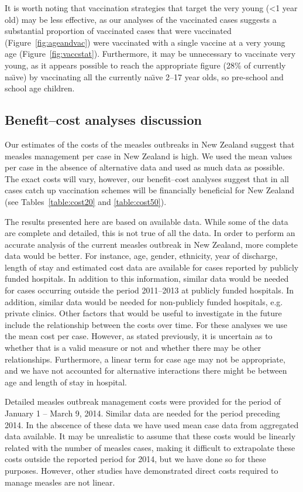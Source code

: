\documentclass{article}
\begin{document}
\begin{itemize}
It is worth noting that vaccination strategies that target the very young (<1 year old) may be less effective, as our analyses of the vaccinated cases suggests a substantial proportion of vaccinated cases that were vaccinated (Figure~\ref{fig:ageandvac}) were vaccinated with a single vaccine at a very young age (Figure~\ref{fig:vaccstat}). Furthermore, it may be unnecessary to vaccinate very young, as it appears possible to reach the appropriate figure (28\% of currently na\"{\i}ve) by vaccinating all the currently na\"{\i}ve 2--17 year olds, so pre-school and school age children.

\subsection{Benefit--cost analyses discussion}

Our estimates of the costs of the measles outbreaks in New Zealand suggest that measles management per case in New Zealand is high. We used the mean values per case in the absence of alternative data and used as much data as possible. The exact costs will vary, however, our benefit--cost analyses suggest that in all cases catch up vaccination schemes will be financially beneficial for New Zealand (see Tables~\ref{table:cost20} and \ref{table:cost50}).

The results presented here are based on available data. While some of the data are complete and detailed, this is not true of all the data. In order to perform an accurate analysis of the current measles outbreak in New Zealand, more complete data would be better. For instance, age, gender, ethnicity, year of discharge, length of stay and estimated cost data are available for cases reported by publicly funded hospitals. In addition to this information, similar data would be needed for cases occurring outside the period 2011--2013 at publicly funded hospitals. In addition, similar data would be needed for non-publicly funded hospitals, e.g. private clinics. Other factors that would be useful to investigate in the future include the relationship between the costs over time. For these analyses we use the mean cost per case. However, as stated previously, it is uncertain as to whether that is a valid measure or not and whether there may be other relationships. Furthermore, a linear term for case age may not be appropriate, and we have not accounted for alternative interactions there might be between age and length of stay in hospital.

Detailed measles outbreak management costs were provided for the period of January 1 -- March 9, 2014. Similar data are needed for the period preceding 2014. In the abscence of these data we have used mean case data from aggregated data available. It may be unrealistic to assume that these costs would be linearly related with the number of measles cases, making it difficult to extrapolate these costs outside the reported period for 2014, but we have done so for these purposes. However, other studies have demonstrated direct costs required to manage measles are not linear.


\end{itemize}
\end{document}
